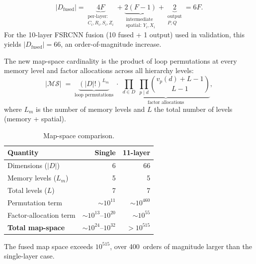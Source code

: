 \documentclass[11pt,a4paper,twocolumn]{article}
\begin{document}
\begingroup
\small
\begin{equation*}
  |D_{\text{fused}}| = 
  \underbrace{4F}_{\substack{\text{per-layer:}\\ C_i, R_i, S_i, Z_i}} + 
  \underbrace{2(F-1)}_{\substack{\text{intermediate}\\ \text{spatial: } Y_i, X_i}} + 
  \underbrace{2}_{\substack{\text{output}\\ P, Q}} 
  = 6F.
\end{equation*}
\endgroup
For the 10-layer FSRCNN fusion (10 fused + 1 output) used in validation, this yields
$|D_{\text{fused}}| = 66$, an order-of-magnitude increase.

The new map-space cardinality is the product of loop permutations at
every memory level and factor allocations across all hierarchy
levels:
%
\begingroup
\small
\begin{equation*}
  |\mathcal{MS}| \;=\;
  \underbrace{(|D|!)^{L_m}}_{\text{loop permutations}}
  \;\cdot\;
  \underbrace{
    \prod_{d \in D}\;\prod_{p \mid d}
      \binom{v_p(d) + L - 1}{L - 1}
  }_{\text{factor allocations}},
  \label{eq:es-mapspace}
\end{equation*}
\endgroup
%
where $L_m$ is the number of memory levels and $L$ the total number
of levels (memory + spatial).


\begin{table}[htbp]
  \centering
  \caption{Map-space comparison.}
  \label{tab:es-mapspace}
  \small
  \begin{tabularx}{\columnwidth}{X r r}
    \toprule
    \textbf{Quantity}
      & \textbf{Single}
      & \textbf{11-layer} \\
    \midrule
    Dimensions ($|D|$)          & 6     & 66 \\
    Memory levels ($L_m$)       & 5     & 5 \\
    Total levels ($L$)          & 7     & 7 \\
    Permutation term            & $\sim\!10^{11}$
                                & $\sim\!10^{460}$ \\
    Factor-allocation term      & $\sim\!10^{13}$--$10^{20}$
                                & $\sim\!10^{55}$ \\
    \addlinespace
    \textbf{Total map-space}    & $\sim\!10^{24}$--$10^{32}$
                                & $>\!10^{515}$ \\
    \bottomrule
  \end{tabularx}
\end{table}
\noindent
The fused map space exceeds $10^{515}$, over 400~orders of magnitude
larger than the single-layer case.
\end{document}
